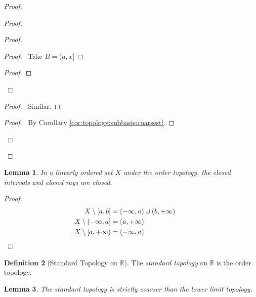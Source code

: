 \documentclass{report}
\let\qed\relax
\newtheorem{lm}{Lemma}[section]
\theoremstyle{definition}
\newtheorem{df}[lm]{Definition}
\begin{document}
\begin{proof}
    \begin{proof}
      \begin{proof}
        \begin{proof}
          \pf\ Take $B = (a, x]$
        \end{proof}
        \begin{proof}
        \end{proof}
      \end{proof}
      \begin{proof}
        \pf\ Similar.
      \end{proof}
      \qedstep
      \begin{proof}
        \pf\ By Corollary \ref{cor:topology:subbasis:coarsest}.
      \end{proof}
    \end{proof}
    \qed
  \end{proof}

  \begin{lm}
    In a linearly ordered set $X$ under the order topology, the closed
    intervals
    and closed rays are closed.
  \end{lm}

  \begin{proof}
    \pf
    \begin{align*}
      X \setminus [a, b] & = (-\infty, a) \cup (b, +\infty) \\
      X \setminus (-\infty, a] & = (a, +\infty) \\
      X \setminus {[}a, +\infty) & = (-\infty, a) & \qed
    \end{align*}
  \end{proof}

  \begin{df}[Standard Topology on $\mathbb{R}$]
    The \emph{standard topology} on $\mathbb{R}$ is the order topology.
  \end{df}

  \begin{lm}
    The standard topology is strictly coarser than the lower limit topology.
  \end{lm}
\end{document}
